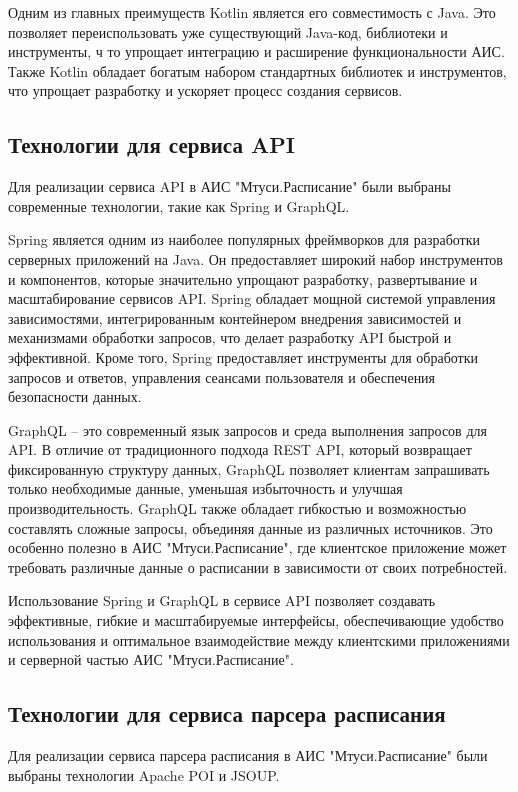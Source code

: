 Одним из главных преимуществ Kotlin является его совместимость с Java.
Это позволяет переиспользовать уже существующий Java-код, библиотеки и инструменты, ч
то упрощает интеграцию и расширение функциональности АИС.
Также Kotlin обладает богатым набором стандартных библиотек и инструментов,
что упрощает разработку и ускоряет процесс создания сервисов.

\subsection{Технологии для сервиса API}
Для реализации сервиса API в АИС "Мтуси.Расписание" были выбраны современные технологии, такие как Spring и GraphQL.

Spring является одним из наиболее популярных фреймворков для разработки серверных приложений на Java.
Он предоставляет широкий набор инструментов и компонентов, которые значительно упрощают разработку,
развертывание и масштабирование сервисов API. Spring обладает мощной системой управления зависимостями,
интегрированным контейнером внедрения зависимостей и механизмами обработки запросов,
что делает разработку API быстрой и эффективной. Кроме того,
Spring предоставляет инструменты для обработки запросов и ответов, управления сеансами пользователя и обеспечения безопасности данных.

GraphQL -- это современный язык запросов и среда выполнения запросов для API.
В отличие от традиционного подхода REST API, который возвращает фиксированную структуру данных,
GraphQL позволяет клиентам запрашивать только необходимые данные,
уменьшая избыточность и улучшая производительность.
GraphQL также обладает гибкостью и возможностью составлять сложные запросы, объединяя данные из различных источников.
Это особенно полезно в АИС "Мтуси.Расписание", где клиентское приложение может требовать
различные данные о расписании в зависимости от своих потребностей.

Использование Spring и GraphQL в сервисе API позволяет создавать эффективные,
гибкие и масштабируемые интерфейсы, обеспечивающие удобство использования и
оптимальное взаимодействие между клиентскими приложениями и серверной частью АИС "Мтуси.Расписание".

\subsection{Технологии для сервиса парсера расписания}
Для реализации сервиса парсера расписания в АИС "Мтуси.Расписание" были выбраны технологии Apache POI и JSOUP.

